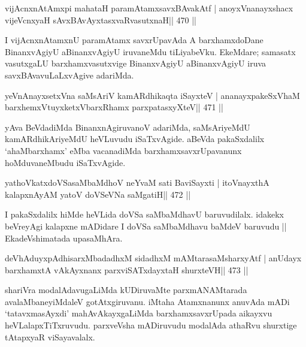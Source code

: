 
\begin{shl}
vijAcnxnAtAmx\s pi mahataH paramAtamxsavxBAvakAtf |
anoyxV\s nanayxshacx vijeVcnxyaH sAvxBAvAyxtasxvaRvasutxnaH\hfill || 470 ||
\end{shl}

\begin{artha}
I vijAcnxnAtamxnU paramAtamx savxrUpavAda A barxhamxdoDane BinanxvAgiyU aBinanxvAgiyU iruvaneMdu tiLiyabeVku. EkeMdare; samasatx vasutxgaLU barxhamxvasutxvige BinanxvAgiyU aBinanxvAgiyU iruva savxBAvavuLaLxvAgive adariMda.
\end{artha}




\begin{shl}
yeVnAnayxsetxVna saMsAriV kamARdhikaqta iSayxteV |
ananayxpakeSxV\s haM barxhemxVtuyxketxVbarxRhamx parxpatasxyXteV\hfill || 471 ||
\end{shl}

\begin{artha}
yAva BeVdadiMda BinanxnAgiruvanoV adariMda, saMsAriyeMdU kamARdhikAriyeMdU heVLuvudu iSaTxvAgide. aBeVda pakaSxdalilx `ahaMbarxhamx' eMba vacanadiMda barxhamxsavxrUpavanunx hoMduvaneMbudu iSaTxvAgide.
\end{artha}

\begin{shl}
yathoVkatxdoVSasaMbaMdhoV neYvaM sati BaviSayxti |
itoV\s nayxthA kalapxnAyAM yatoV doVSeVNa saMgatiH\hfill || 472 ||
\end{shl}

\begin{artha}
I pakaSxdalilx hiMde heVLida doVSa saMbaMdhavU baruvudilalx. idakekx beVreyAgi kalapxne mADidare I doVSa saMbaMdhavu baMdeV baruvudu || EkadeVshimatada upasaMhAra.
\end{artha}



\begin{shl}
deVhAduyxpAdhisarxMbadadhxM sidadhxM mAMtarasaMsharxyAtf |
anUdayx barxhamxtA vAkAyxnanx parxviSATxdayxtaH shurxteVH\hfill || 473 ||
\end{shl}

\begin{artha}
shariVra modalAdavugaLiMda kUDiruvaMte parxmANAMtarada  avalaMbaneyiMdaleV gotAtxgiruvanu. iMtaha Atamxnanunx anuvAda mADi `tatavxmasAyxdi' mahAvAkayxgaLiMda barxhamxsavxrUpada aikayxvu heVLalapxTiTxruvudu. parxveVsha mADiruvudu modalAda athaRvu shurxtige tAtapxyaR viSayavalalx.
\end{artha}


